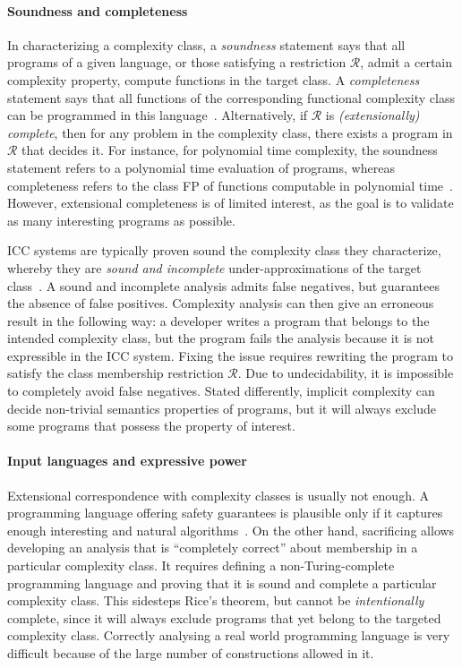 \paragraph*{Soundness and completeness}
In characterizing a complexity class,
a \emph{soundness} statement says that all programs of a given language, or those satisfying a restriction \(\mathcal{R}\), admit a certain complexity property, \ie compute functions in the target class.
A \emph{completeness} statement says that all functions of the corresponding functional complexity class can be programmed in this language~\cite{baillot2012}.
Alternatively, if \(\mathcal{R}\) is \emph{(extensionally) complete}, then for any problem in the complexity class, there exists a program in \(\mathcal{R}\) that decides it.
For instance, for polynomial time complexity, the soundness statement refers to a polynomial time evaluation of programs, whereas completeness refers to the class FP of functions computable in polynomial time~\cite{baillot2012}.
However, extensional completeness is of limited interest, as the goal is to validate as many interesting programs as possible.

ICC systems are typically proven sound \wrt the complexity class they characterize, whereby they are \emph{sound and incomplete} under-approximations of the target class~\cite[p. 125]{moyen2017}.
A sound and incomplete analysis admits false negatives, but guarantees the absence of false positives.
Complexity analysis can then give an erroneous result in the following way:
a developer writes a program that belongs to the intended complexity class,
but the program fails the analysis because it is not expressible in the ICC system.
Fixing the issue requires rewriting the program to satisfy the class membership restriction \(\mathcal{R}\).
Due to undecidability, it is impossible to completely avoid false negatives.
Stated differently, implicit complexity can decide non-trivial semantics properties of programs, but it will always exclude some programs that possess the property of interest.

\paragraph*{Input languages and expressive power}
Extensional correspondence with complexity classes is usually not enough.
A programming language offering safety guarantees is plausible only
if it captures enough interesting and natural algorithms~\cite{baillot2012}.
On the other hand, sacrificing  allows developing an analysis that is \enquote{completely correct} about membership in a particular complexity class.
It requires defining a non-Turing-complete programming language and proving that it is sound and complete \wrt a particular complexity class.
This sidesteps Rice's theorem, but cannot be \emph{intentionally} complete, since it will always exclude programs that yet belong to the targeted complexity class.
Correctly analysing a real world programming language is very difficult because of the large number of constructions allowed in it.

